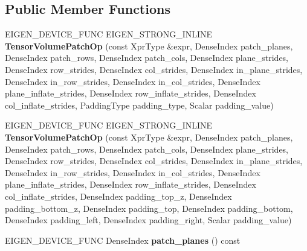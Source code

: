 \subsection*{Public Member Functions}
\begin{DoxyCompactItemize}
\item 
\mbox{\label{class_eigen_1_1_tensor_volume_patch_op_abd3362f3580aede62382a3bea56d3edd}} 
E\+I\+G\+E\+N\+\_\+\+D\+E\+V\+I\+C\+E\+\_\+\+F\+U\+NC E\+I\+G\+E\+N\+\_\+\+S\+T\+R\+O\+N\+G\+\_\+\+I\+N\+L\+I\+NE {\bfseries Tensor\+Volume\+Patch\+Op} (const Xpr\+Type \&expr, Dense\+Index patch\+\_\+planes, Dense\+Index patch\+\_\+rows, Dense\+Index patch\+\_\+cols, Dense\+Index plane\+\_\+strides, Dense\+Index row\+\_\+strides, Dense\+Index col\+\_\+strides, Dense\+Index in\+\_\+plane\+\_\+strides, Dense\+Index in\+\_\+row\+\_\+strides, Dense\+Index in\+\_\+col\+\_\+strides, Dense\+Index plane\+\_\+inflate\+\_\+strides, Dense\+Index row\+\_\+inflate\+\_\+strides, Dense\+Index col\+\_\+inflate\+\_\+strides, Padding\+Type padding\+\_\+type, Scalar padding\+\_\+value)
\item 
\mbox{\label{class_eigen_1_1_tensor_volume_patch_op_a2b9eb5266ca20600764f7c7f03e09d40}} 
E\+I\+G\+E\+N\+\_\+\+D\+E\+V\+I\+C\+E\+\_\+\+F\+U\+NC E\+I\+G\+E\+N\+\_\+\+S\+T\+R\+O\+N\+G\+\_\+\+I\+N\+L\+I\+NE {\bfseries Tensor\+Volume\+Patch\+Op} (const Xpr\+Type \&expr, Dense\+Index patch\+\_\+planes, Dense\+Index patch\+\_\+rows, Dense\+Index patch\+\_\+cols, Dense\+Index plane\+\_\+strides, Dense\+Index row\+\_\+strides, Dense\+Index col\+\_\+strides, Dense\+Index in\+\_\+plane\+\_\+strides, Dense\+Index in\+\_\+row\+\_\+strides, Dense\+Index in\+\_\+col\+\_\+strides, Dense\+Index plane\+\_\+inflate\+\_\+strides, Dense\+Index row\+\_\+inflate\+\_\+strides, Dense\+Index col\+\_\+inflate\+\_\+strides, Dense\+Index padding\+\_\+top\+\_\+z, Dense\+Index padding\+\_\+bottom\+\_\+z, Dense\+Index padding\+\_\+top, Dense\+Index padding\+\_\+bottom, Dense\+Index padding\+\_\+left, Dense\+Index padding\+\_\+right, Scalar padding\+\_\+value)
\item 
\mbox{\label{class_eigen_1_1_tensor_volume_patch_op_a4717a5f0dce3370fb6ef4c1683a539ea}} 
E\+I\+G\+E\+N\+\_\+\+D\+E\+V\+I\+C\+E\+\_\+\+F\+U\+NC Dense\+Index {\bfseries patch\+\_\+planes} () const
\item 

\end{DoxyCompactItemize}
